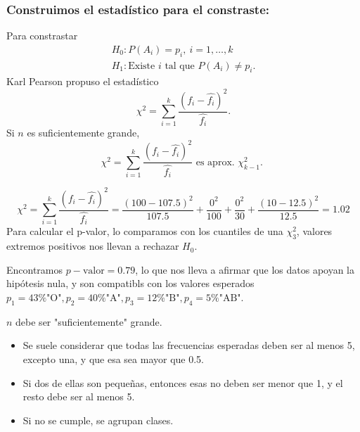 \subsubsection*{Construimos el estadístico para el constraste:}
\begin{tcolorbox}[colback=blue!5!white, colframe=blue!75!black, title=\textbf{El estaístico chi-cuadrado de Pearson}]
Para constrastar \[
\begin{array}{l}
    H_0:P(A_i)=p_i,\:i=1,\dots,k\\
    H_1:\text{Existe $i$ tal que  $P(A_i)\neq p_i$.}
\end{array}
\] 
Karl Pearson propuso el estadístico \[
\chi^2=\sum_{i=1}^{k} \dfrac{\left( f_i-\hat{f_i} \right) ^2}{\hat{f_i}}.
\] 
Si $n$ es suficientemente grande,  \[
\chi^2=\sum_{i=1}^{k} \dfrac{\left( f_i-\hat{f_i} \right) ^2}{\hat{f_i}}\text{ es aprox. $\chi_{k-1}^2$. }
\] 
\end{tcolorbox}
\[
\chi^2=\sum_{i=1}^{k} \dfrac{\left( f_i-\hat{f_i} \right) ^2}{\hat{f_i}}=\dfrac{(100-107.5)^2}{107.5}+\dfrac{0^2}{100}+\dfrac{0^2}{30}+\dfrac{(10-12.5)^2}{12.5}=1.02
\] 
Para calcular el p-valor, lo comparamos con los cuantiles de una $\chi_3^2$, valores extremos positivos nos llevan a rechazar $H_0$.
\begin{tcolorbox}[colback=blue!5!white, colframe=blue!75!black, title=\textbf{p-valor:}]
Encontramos $p-\text{valor}=0.79$, lo que nos lleva a afirmar que los datos apoyan la hipótesis nula, y son compatibls con los valores esperados $p_1=43\%\text{"O"},p_2=40\%\text{"A"},p_3=12\%\text{"B"},p_4=5\%\text{"AB"}$.
\end{tcolorbox}
\begin{tcolorbox}[colback=olive!5!white, colframe=olive!75!black, title=\textbf{Validez de la aproximación de la distribución de estadístico de Pearson por un $\chi_{k-1}^2$.}]
$n$ debe ser "suficientemente" grande.
\begin{itemize}[label=\textbullet]
    \item Se suele considerar que todas las frecuencias esperadas deben ser al menos 5, excepto una, y que esa sea mayor que 0.5.
    \item Si dos de ellas son pequeñas, entonces esas no deben ser menor que 1, y el resto debe ser al menos 5.
    \item Si no se cumple, se agrupan clases.
\end{itemize}
\end{tcolorbox}

